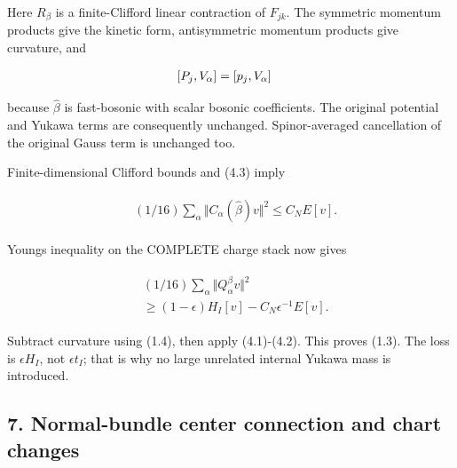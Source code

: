 Here \(R_{\beta}\) is a finite-Clifford linear contraction of
\(F_{jk}\). The symmetric momentum products give the kinetic form,
antisymmetric momentum products give curvature, and

\begin{gather*}
\begin{aligned}
& [P_{j},V_{\alpha}]=[p_{j},V_{\alpha}]
\end{aligned}\notag
\end{gather*}

because \(\widehat{\beta}\) is fast-bosonic with scalar bosonic
coefficients. The original potential and Yukawa terms are consequently
unchanged. Spinor-averaged cancellation of the original Gauss term is
unchanged too.

Finite-dimensional Clifford bounds and (4.3) imply

\begin{gather*}
\begin{aligned}
& (1/16)\sum _{\alpha} \Vert C_{\alpha}(\widehat{\beta})v\Vert ^{2} \le  C_{N} E[v].
\end{aligned}\tag{6.2}
\end{gather*}

Young\textquotesingle s inequality on the COMPLETE charge stack now
gives

\begin{gather*}
\begin{aligned}
& (1/16)\sum _{\alpha} \Vert Q_{\alpha}^{\beta} v\Vert ^{2} \\
& \ge (1-\epsilon )H_{I}[v]-C_{N} \epsilon ^{-1} E[v].
\end{aligned}\tag{6.3}
\end{gather*}

Subtract curvature using (1.4), then apply (4.1)-(4.2). This proves
(1.3). The loss is \(\epsilon  H_{I}\), not \(\epsilon  t_{I}\); that is
why no large unrelated internal Yukawa mass is introduced.

\subsection{7. Normal-bundle center connection and chart
changes}\label{g-normal-bundle-center-connection-and-chart-changes}

